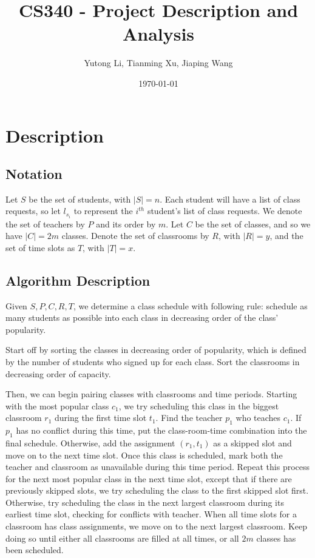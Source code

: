 \documentclass[11pt, oneside]{article}   	%
\title{CS340 - Project Description and Analysis}
\author{Yutong Li, Tianming Xu, Jiaping Wang}
\date{\today}							%
\begin{document}
\maketitle

\section{Description}
\subsection{Notation}
Let $S$ be the set of students, with $|S|=n$. Each student will have a list of class requests, so let $l_{s_i}$ to represent the $i^{th}$ student's list of class requests. We denote the set of teachers by $P$ and its order by $m$. Let $C$ be the set of classes, and so we have $|C|=2m$ classes. Denote the set of classrooms by $R$, with $|R|=y$, and the set of time slots as $T$, with $|T|=x$. 
\subsection{Algorithm Description}
Given $S, P, C, R, T$, we determine a class schedule with following rule: schedule as many students as possible into each class in decreasing order of the class' popularity. \par 
Start off by sorting the classes in decreasing order of popularity, which is defined by the number of students who signed up for each class. Sort the classrooms in decreasing order of capacity. 

Then, we can begin pairing classes with classrooms and time periods. Starting with the most popular class $c_1$, we try scheduling this class in the biggest classroom $r_1$ during the first time slot $t_1$. Find the teacher $p_1$ who teaches $c_1$. If $p_1$ has no conflict during this time, put the class-room-time combination into the final schedule. Otherwise, add the assignment $(r_1, t_1)$ as a skipped slot and move on to the next time slot. Once this class is scheduled, mark both the teacher and classroom as unavailable during this time period. Repeat this process for the next most popular class in the next time slot, except that if there are previously skipped slots, we try scheduling the class to the first skipped slot first. Otherwise, try scheduling the class in the next largest classroom during its earliest time slot, checking for conflicts with teacher. When all time slots for a classroom has class assignments, we move on to the next largest classroom. Keep doing so until either all classrooms are filled at all times, or all $2m$ classes has been scheduled.\\
\end{document}
